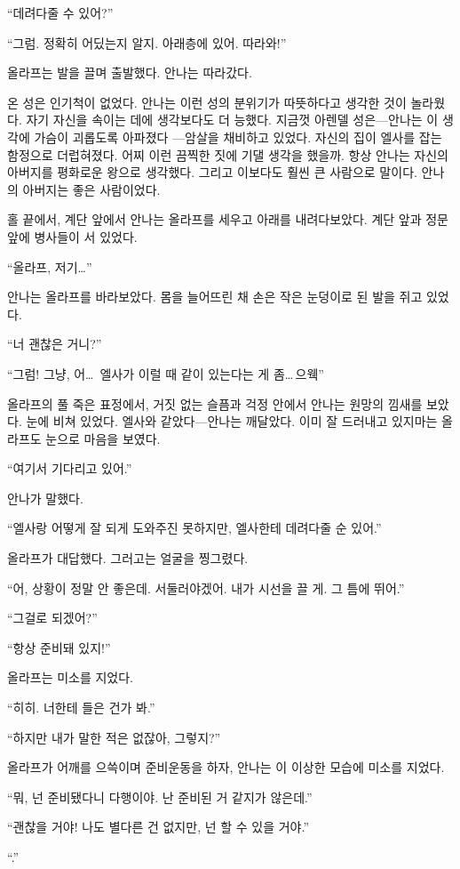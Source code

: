 ``데려다줄 수 있어?''

``그럼. 정확히 어딨는지 알지. 아래층에 있어. 따라와!''

올라프는 발을 끌며 출발했다. 안나는 따라갔다.

온 성은 인기척이 없었다. 안나는 이런 성의 분위기가 따뜻하다고 생각한 것이 놀라웠다. 자기 자신을 속이는 데에 생각보다도 더 능했다. 지금껏 아렌델 성은—안나는 이 생각에 가슴이 괴롭도록 아파졌다 —암살을 채비하고 있었다. 자신의 집이 엘사를 잡는 함정으로 더럽혀졌다. 어찌 이런 끔찍한 짓에 기댈 생각을 했을까. 항상 안나는 자신의 아버지를 평화로운 왕으로 생각했다. 그리고 이보다도 훨씬 큰 사람으로 말이다. 안나의 아버지는 좋은 사람이었다.

홀 끝에서, 계단 앞에서 안나는 올라프를 세우고 아래를 내려다보았다. 계단 앞과 정문 앞에 병사들이 서 있었다.

``올라프, 저기\ldots''

안나는 올라프를 바라보았다. 몸을 늘어뜨린 채 손은 작은 눈덩이로 된 발을 쥐고 있었다.

``너 괜찮은 거니?''

``그럼! 그냥, 어\ldots\, 엘사가 이럴 때 같이 있는다는 게 좀\ldots\,으웩''

올라프의 풀 죽은 표정에서, 거짓 없는 슬픔과 걱정 안에서 안나는 원망의 낌새를 보았다. 눈에 비쳐 있었다. 엘사와 같았다—안나는 깨달았다. 이미 잘 드러내고 있지마는 올라프도 눈으로 마음을 보였다.

``여기서 기다리고 있어.''

안나가 말했다.

``엘사랑 어떻게 잘 되게 도와주진 못하지만, 엘사한테 데려다줄 순 있어.''

올라프가 대답했다. 그러고는 얼굴을 찡그렸다.

``어, 상황이 정말 안 좋은데. 서둘러야겠어. 내가 시선을 끌 게. 그 틈에 뛰어.''

``그걸로 되겠어?''

``항상 준비돼 있지!''

올라프는 미소를 지었다.

``히히. 너한테 들은 건가 봐.''

``하지만 내가 말한 적은 없잖아, 그렇지?''

올라프가 어깨를 으쓱이며 준비운동을 하자, 안나는 이 이상한 모습에 미소를 지었다.

``뭐, 넌 준비됐다니 다행이야. 난 준비된 거 같지가 않은데.''

``괜찮을 거야! 나도 별다른 건 없지만, 넌 할 수 있을 거야.''

``.''

